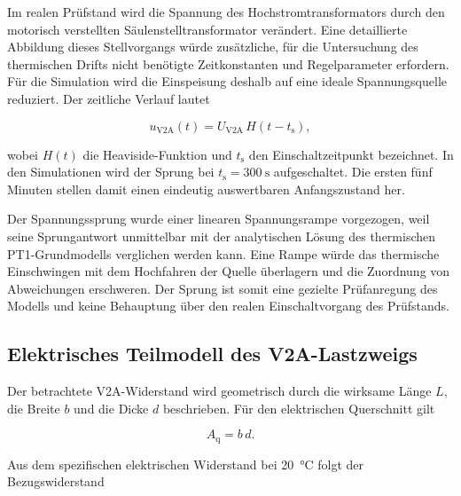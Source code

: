 Im realen Prüfstand wird die Spannung des Hochstromtransformators durch den
motorisch verstellten Säulenstelltransformator verändert. Eine detaillierte
Abbildung dieses Stellvorgangs würde zusätzliche, für die Untersuchung des
thermischen Drifts nicht benötigte Zeitkonstanten und Regelparameter erfordern.
Für die Simulation wird die Einspeisung deshalb auf eine ideale
Spannungsquelle reduziert. Der zeitliche Verlauf lautet

\begin{equation}
    u_{\mathrm{V2A}}(t)
    =
    U_{\mathrm{V2A}}\,H\!\left(t-t_{\mathrm{s}}\right),
    \label{eq:modell_spannungssprung}
\end{equation}

wobei \(H(t)\) die Heaviside-Funktion und \(t_{\mathrm{s}}\) den
Einschaltzeitpunkt bezeichnet. In den Simulationen wird der Sprung bei
\(t_{\mathrm{s}}=\SI{300}{\second}\) aufgeschaltet. Die ersten fünf Minuten
stellen damit einen eindeutig auswertbaren Anfangszustand her.

Der Spannungssprung wurde einer linearen Spannungsrampe vorgezogen, weil seine
Sprungantwort unmittelbar mit der analytischen Lösung des thermischen
PT1-Grundmodells verglichen werden kann. Eine Rampe würde das thermische
Einschwingen mit dem Hochfahren der Quelle überlagern und die Zuordnung von
Abweichungen erschweren. Der Sprung ist somit eine gezielte Prüfanregung des
Modells und keine Behauptung über den realen Einschaltvorgang des Prüfstands.


\subsection{Elektrisches Teilmodell des V2A-Lastzweigs}
\label{sec:elektrisches_teilmodell}

Der betrachtete V2A-Widerstand wird geometrisch durch die wirksame Länge \(L\),
die Breite \(b\) und die Dicke \(d\) beschrieben. Für den elektrischen
Querschnitt gilt

\begin{equation}
    A_{\mathrm{q}}=b\,d.
    \label{eq:modell_elektrischer_querschnitt}
\end{equation}

Aus dem spezifischen elektrischen Widerstand bei
\SI{20}{\degreeCelsius} folgt der Bezugswiderstand

